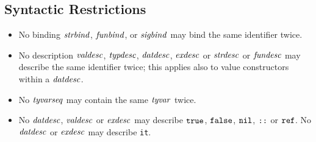 \subsection{Syntactic Restrictions}
\begin{itemize}
\item No binding ${\it strbind}$, ${\it funbind}$, or ${\it sigbind}$ may bind the
      same identifier twice.
\item No description ${\it valdesc}$, ${\it typdesc}$, ${\it datdesc}$, 
       ${\it exdesc}$ or ${\it strdesc}$ or ${\it fundesc}$ may describe the same identifier
       twice; this applies also to value constructors within a ${\it datdesc}$.
\item No ${\it tyvarseq}$ may contain the same ${\it tyvar}$ twice.
\item No ${\it datdesc}$, ${\it valdesc}$ 
or ${\it exdesc}$ may describe 
$\mbox{\tt true}$, $\mbox{\tt false}$, $\mbox{\tt nil}$, $\mbox{\tt ::}$ or $\mbox{\tt ref}$.
No ${\it datdesc}$ or ${\it exdesc}$ may describe {\tt it}.
\end{itemize}
